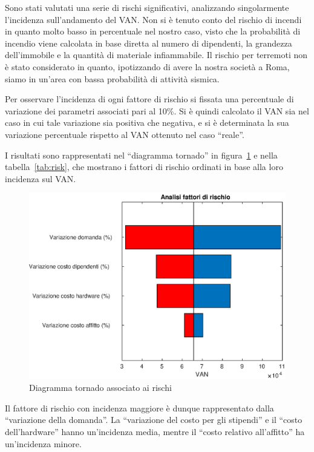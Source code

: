 Sono stati valutati una serie di rischi significativi, analizzando singolarmente
l’incidenza sull’andamento del VAN. Non si è tenuto conto del rischio di
incendi in quanto molto basso in percentuale nel nostro caso, visto che la
probabilità di incendio viene calcolata in base diretta al numero di dipendenti,
la grandezza dell’immobile e la quantità di materiale infiammabile. Il rischio
per terremoti non è stato considerato in quanto, ipotizzando di avere la nostra
società a Roma, siamo in un’area con bassa probabilità di attività sismica.

Per osservare l’incidenza di ogni fattore di rischio si fissata una
percentuale di variazione dei parametri associati pari al 10\%. Si è quindi
calcolato il VAN sia nel caso in cui tale variazione sia positiva che negativa,
e si è determinata la sua variazione percentuale rispetto al VAN ottenuto nel
caso “reale”.

I risultati sono rappresentati nel “diagramma tornado” in figura~\ref{tornado} e
nella tabella~\ref{tab:risk}, che mostrano i fattori di rischio ordinati in base
alla loro incidenza sul VAN.

%
\begin{figure}[!h]
\centering
\includegraphics[width=\textwidth]{figures/tornado}
\caption{Diagramma tornado associato ai rischi}
\label{tornado}
\end{figure}
%
Il fattore di rischio con incidenza maggiore è dunque rappresentato dalla
“variazione della domanda”. La “variazione del costo per gli stipendi” e il
“costo dell’hardware” hanno un’incidenza media, mentre il “costo relativo
all’affitto” ha un’incidenza minore.
